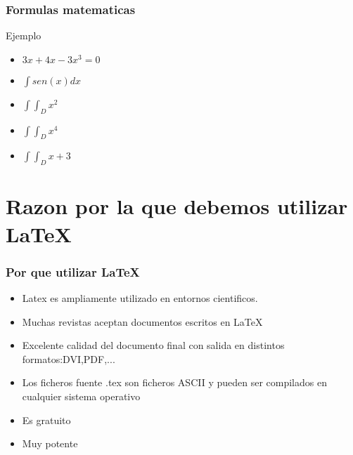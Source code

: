 \documentclass{beamer}
\begin{document}
\begin{frame}

\frametitle{Formulas matematicas}

\begin{block}{Ejemplo}
  \begin{itemize}
  \item
  $3x+4x-3x^3=0$ 
  \pause

  \item
  $\int sen(x) dx$
  \pause

  \item
  $\int\int_D x^2$
  \pause

  \item
  $\int\int_D x^4$
  \pause
  
  \item
  $\int\int_D x+3$
  \pause
  
  \end{itemize}
\end{block}

\end{frame}

\section{Razon por la que debemos utilizar \LaTeX}
\begin{frame}

\frametitle{Por que utilizar LaTeX}
\begin{itemize}
 \item 
 Latex es ampliamente utilizado en entornos cientificos.
 \pause
 
 \item
 Muchas revistas aceptan documentos escritos en \LaTeX
 \pause
 
 \item
 Excelente calidad del documento final con salida en distintos formatos:DVI,PDF,...
 \pause
 
 \item
 Los ficheros fuente .tex son ficheros ASCII y pueden ser compilados en cualquier sistema operativo
 \pause
 
 \item
 Es gratuito
 \pause
 
 \item
 Muy potente
 \pause
\end{itemize}

\end{frame} 
\end{document}

